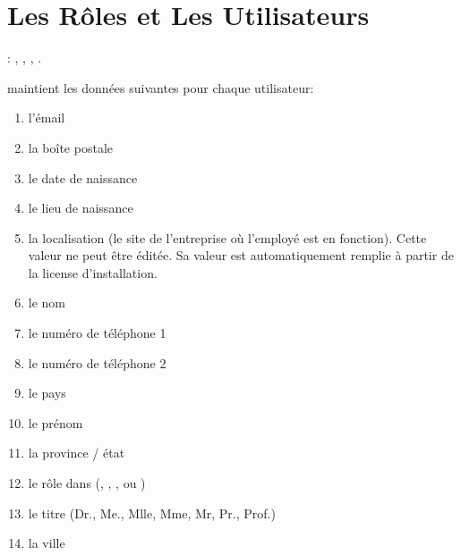 \chapter{Les R\^oles et Les Utilisateurs}\label{chap:utilisateurs}

\utilisateurs: \lienadmin, \liencaissier, \lienmagasinier, \lienpatron.\\


\label{sec:utilisateurs-introduction}

\yeren maintient les donn\'ees suivantes pour chaque utilisateur:
\begin{enumerate}[1)]
	\item l'\'email \optionel
	\item la bo\^ite postale
	\item le date de naissance \optionel
	\item le lieu de naissance \optionel
	\item la localisation (le site de l'entreprise o\`u l'employ\'e
	      est en fonction). Cette valeur ne peut \^etre \'edit\'ee.
	      Sa valeur est automatiquement remplie \`a partir de la
	      license d'installation.
	\item le nom
	\item le num\'ero de t\'el\'ephone 1 \optionel
	\item le num\'ero de t\'el\'ephone 2 \optionel
	\item le pays \optionel
	\item le pr\'enom	
	\item la province / \'etat
	\item le r\^ole dans \yeren (\admin, \magasinier, \caissier, ou \patron)
	\item le titre (Dr., Me., Mlle, Mme, Mr, Pr., Prof.)
	\item la ville \optionel
\end{enumerate}

\newpage



\newpage



\newpage



\newpage


	
\newpage


